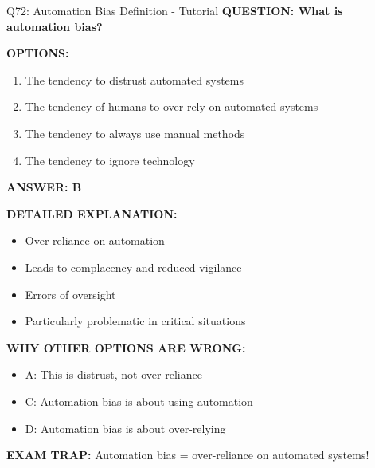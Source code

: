 \documentclass[8pt]{beamer}
\begin{document}
	\begin{frame}{Q72: Automation Bias Definition - Tutorial}
		\fontsize{6.5}{7.5}\selectfont
		\textbf{QUESTION: What is automation bias?}
		
		\vspace{0.1cm}
		\textbf{OPTIONS:}
		\begin{enumerate}
			\item The tendency to distrust automated systems
			\item The tendency of humans to over-rely on automated systems
			\item The tendency to always use manual methods
			\item The tendency to ignore technology
		\end{enumerate}
		
		\vspace{0.1cm}
		\textcolor{myblue}{\textbf{ANSWER: B}}
		
		\vspace{0.1cm}
		\textbf{DETAILED EXPLANATION:}
		\begin{itemize}
			\item Over-reliance on automation
			\item Leads to complacency and reduced vigilance
			\item Errors of oversight
			\item Particularly problematic in critical situations
		\end{itemize}
		
		\vspace{0.1cm}
		\textcolor{myred}{\textbf{WHY OTHER OPTIONS ARE WRONG:}}
		\begin{itemize}
			\item \textcolor{myred}{A:} This is distrust, not over-reliance
			\item \textcolor{myred}{C:} Automation bias is about using automation
			\item \textcolor{myred}{D:} Automation bias is about over-relying
		\end{itemize}
		
		\textcolor{myred}{\textbf{EXAM TRAP:}} Automation bias = \textcolor{myblue}{over-reliance on automated systems}!
	\end{frame}
	
\end{document}
